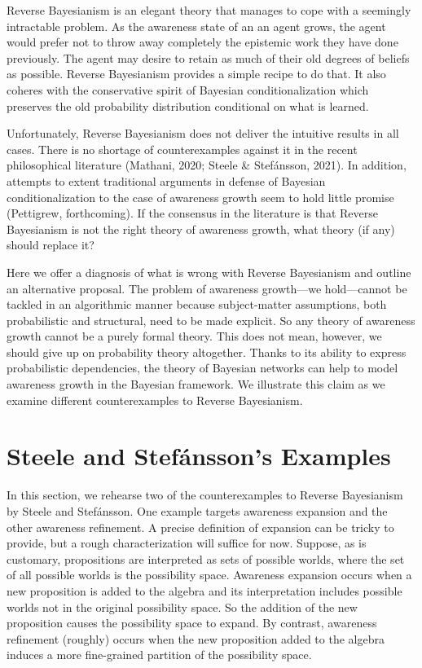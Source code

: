 \documentclass[
  11pt,
  dvipsnames,enabledeprecatedfontcommands]{scrartcl}
\begin{document}
Reverse Bayesianism is an elegant theory that manages to cope with a
seemingly intractable problem. As the awareness state of an an agent
grows, the agent would prefer not to throw away completely the epistemic
work they have done previously. The agent may desire to retain as much
of their old degrees of beliefs as possible. Reverse Bayesianism
provides a simple recipe to do that. It also coheres with the
conservative spirit of Bayesian conditionalization which preserves the
old probability distribution conditional on what is learned.

Unfortunately, Reverse Bayesianism does not deliver the intuitive
results in all cases. There is no shortage of counterexamples against it
in the recent philosophical literature (Mathani, 2020; Steele \&
Stefánsson, 2021). In addition, attempts to extent traditional arguments
in defense of Bayesian conditionalization to the case of awareness
growth seem to hold little promise (Pettigrew, forthcoming). If the
consensus in the literature is that Reverse Bayesianism is not the right
theory of awareness growth, what theory (if any) should replace it?

Here we offer a diagnosis of what is wrong with Reverse Bayesianism and
outline an alternative proposal. The problem of awareness growth---we
hold---cannot be tackled in an algorithmic manner because subject-matter
assumptions, both probabilistic and structural, need to be made
explicit. So any theory of awareness growth cannot be a purely formal
theory. This does not mean, however, we should give up on probability
theory altogether. Thanks to its ability to express probabilistic
dependencies, the theory of Bayesian networks can help to model
awareness growth in the Bayesian framework. We illustrate this claim as
we examine different counterexamples to Reverse Bayesianism.

\hypertarget{steele-and-stefuxe1nssons-examples}{%
\section{Steele and Stefánsson's
Examples}\label{steele-and-stefuxe1nssons-examples}}

\label{sec:counterexamples}

In this section, we rehearse two of the counterexamples to Reverse
Bayesianism by Steele and Stefánsson. One example targets awareness
expansion and the other awareness refinement. A precise definition of
expansion can be tricky to provide, but a rough characterization will
suffice for now. Suppose, as is customary, propositions are interpreted
as sets of possible worlds, where the set of all possible worlds is the
possibility space. Awareness expansion occurs when a new proposition is
added to the algebra and its interpretation includes possible worlds not
in the original possibility space. So the addition of the new
proposition causes the possibility space to expand. By contrast,
awareness refinement (roughly) occurs when the new proposition added to
the algebra induces a more fine-grained partition of the possibility
space.
\end{document}
